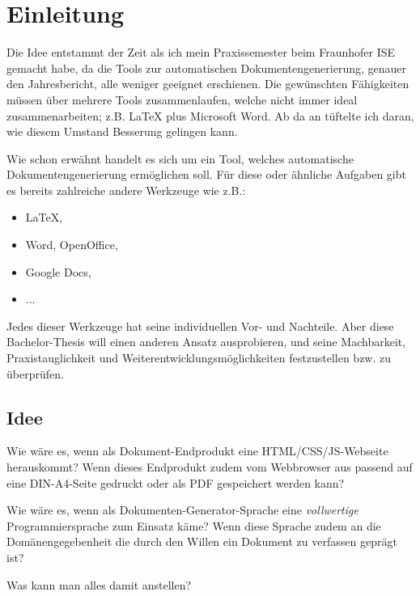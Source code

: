 \chapter{Einleitung}

Die Idee entstammt der Zeit als ich mein Praxissemester beim Fraunhofer ISE
gemacht habe, da die Tools zur automatischen Dokumentengenerierung, genauer
den Jahresbericht, alle weniger geeignet erschienen. Die gewünschten
Fähigkeiten müssen über mehrere Tools zusammenlaufen, welche nicht immer
ideal zusammenarbeiten; z.B. LaTeX plus Microsoft Word. Ab da an tüftelte
ich daran, wie diesem Umstand Besserung gelingen kann.

Wie schon erwähnt handelt es sich um ein Tool, welches automatische
Dokumentengenerierung ermöglichen soll. Für diese oder ähnliche Aufgaben
gibt es bereits zahlreiche andere Werkzeuge wie z.B.:

\begin{itemize}
  \item LaTeX,
  \item Word, OpenOffice,
  \item Google Docs,
  \item ...
\end{itemize}

Jedes dieser Werkzeuge hat seine individuellen Vor- und Nachteile.
Aber diese Bachelor-Thesis will einen anderen Ansatz ausprobieren, und
seine Machbarkeit, Praxistauglichkeit und Weiterentwicklungsmöglichkeiten
festzustellen bzw. zu überprüfen.

\section{Idee}

Wie wäre es, wenn als Dokument-Endprodukt eine HTML/CSS/JS-Webseite
herauskommt? Wenn dieses Endprodukt zudem vom Webbrowser aus passend auf
eine DIN-A4-Seite gedruckt oder als PDF gespeichert werden kann?

Wie wäre es, wenn als Dokumenten-\-Generator-\-Sprache eine \emph{vollwertige}
Programmiersprache zum Einsatz käme? Wenn diese Sprache zudem an die
Domänen\-gege\-ben\-heit die durch den Willen ein Dokument zu verfassen geprägt ist?

Was kann man alles damit anstellen?

